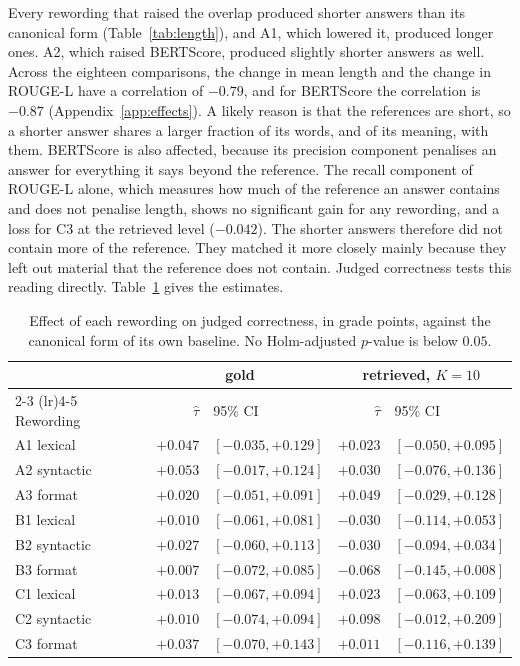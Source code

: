 \documentclass[12pt,a4paper,oneside]{scrreprt}
\begin{document}
Every rewording that raised the overlap produced shorter answers than its canonical form (Table~\ref{tab:length}), and A1, which lowered it, produced longer ones. A2, which raised BERTScore, produced slightly shorter answers as well. Across the eighteen comparisons, the change in mean length and the change in ROUGE-L have a correlation of $-0.79$, and for BERTScore the correlation is $-0.87$ (Appendix~\ref{app:effects}). A likely reason is that the references are short, so a shorter answer shares a larger fraction of its words, and of its meaning, with them. BERTScore is also affected, because its precision component penalises an answer for everything it says beyond the reference. The recall component of ROUGE-L alone, which measures how much of the reference an answer contains and does not penalise length, shows no significant gain for any rewording, and a loss for C3 at the retrieved level ($-0.042$). The shorter answers therefore did not contain more of the reference. They matched it more closely mainly because they left out material that the reference does not contain. Judged correctness tests this reading directly. Table~\ref{tab:judgeeffects} gives the estimates.

\begin{table}[htbp]
\centering
\caption{Effect of each rewording on judged correctness, in grade points, against the canonical form of its own baseline. No Holm-adjusted $p$-value is below $0.05$.}
\label{tab:judgeeffects}
\begin{tabular}{lrlrl}
\toprule
 & \multicolumn{2}{c}{gold} & \multicolumn{2}{c}{retrieved, $K = 10$} \\
\cmidrule(lr){2-3} \cmidrule(lr){4-5}
Rewording & $\hat{\tau}$ & 95\% CI & $\hat{\tau}$ & 95\% CI \\
\midrule
A1 lexical   & $+0.047$ & $[-0.035, +0.129]$ & $+0.023$ & $[-0.050, +0.095]$ \\
A2 syntactic & $+0.053$ & $[-0.017, +0.124]$ & $+0.030$ & $[-0.076, +0.136]$ \\
A3 format    & $+0.020$ & $[-0.051, +0.091]$ & $+0.049$ & $[-0.029, +0.128]$ \\
B1 lexical   & $+0.010$ & $[-0.061, +0.081]$ & $-0.030$ & $[-0.114, +0.053]$ \\
B2 syntactic & $+0.027$ & $[-0.060, +0.113]$ & $-0.030$ & $[-0.094, +0.034]$ \\
B3 format    & $+0.007$ & $[-0.072, +0.085]$ & $-0.068$ & $[-0.145, +0.008]$ \\
C1 lexical   & $+0.013$ & $[-0.067, +0.094]$ & $+0.023$ & $[-0.063, +0.109]$ \\
C2 syntactic & $+0.010$ & $[-0.074, +0.094]$ & $+0.098$ & $[-0.012, +0.209]$ \\
C3 format    & $+0.037$ & $[-0.070, +0.143]$ & $+0.011$ & $[-0.116, +0.139]$ \\
\bottomrule
\end{tabular}
\end{table}
\end{document}
